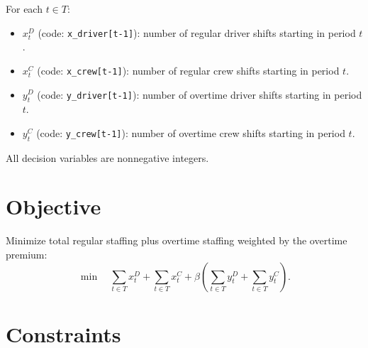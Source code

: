 For each $t\in T$:
\begin{itemize}
    \item $x_t^{D}$ (code: \texttt{x\_driver[t-1]}): number of regular driver shifts starting in period $t$.
    \item $x_t^{C}$ (code: \texttt{x\_crew[t-1]}): number of regular crew shifts starting in period $t$.
    \item $y_t^{D}$ (code: \texttt{y\_driver[t-1]}): number of overtime driver shifts starting in period $t$.
    \item $y_t^{C}$ (code: \texttt{y\_crew[t-1]}): number of overtime crew shifts starting in period $t$.
\end{itemize}

All decision variables are nonnegative integers.

\section*{Objective}

Minimize total regular staffing plus overtime staffing weighted by the overtime premium:
\[
\min \quad
\sum_{t\in T} x_t^{D}
+\sum_{t\in T} x_t^{C}
+\beta\left(\sum_{t\in T} y_t^{D}+\sum_{t\in T} y_t^{C}\right).
\]

\section*{Constraints}

